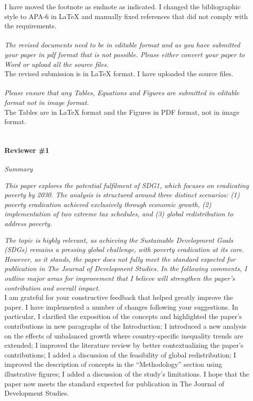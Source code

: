\documentclass[12pt,english]{article}
\begin{document}
I have moved the footnote as endnote as indicated. I changed the bibliographic style to APA-6 in LaTeX and manually fixed references that did not comply with the requirements. 
~\\ ~\\

\textit{The revised documents need to be in editable format and as you have submitted your paper in pdf format that is not possible. Please either convert your paper to Word or upload all the source files.}~\\

The revised submission is in LaTeX format. I have uploaded the source files.
~\\ ~\\

\textit{Please ensure that any Tables, Equations and Figures are submitted in editable format not in image format.}~\\

The Tables are in LaTeX format and the Figures in PDF format, not in image format.
~\\ ~\\


\paragraph*{Reviewer \#1}

\textit{Summary}

\textit{This paper explores the potential fulfilment of SDG1, which focuses on eradicating poverty by 2030. The analysis is structured around three distinct scenarios: (1) poverty eradication achieved exclusively through economic growth, (2) implementation of two extreme tax schedules, and (3) global redistribution to address poverty. }

\textit{The topic is highly relevant, as achieving the Sustainable Development Goals (SDGs) remains a pressing global challenge, with poverty eradication at its core. However, as it stands, the paper does not fully meet the standard expected for publication in The Journal of Development Studies. In the following comments, I outline major areas for improvement that I believe will strengthen the paper's contribution and overall impact.}~\\

I am grateful for your constructive feedback that helped greatly improve the paper. I have implemented a number of changes following your suggestions. In particular, I clarified the exposition of the concepts and highlighted the paper's contributions in new paragraphs of the Introduction; I introduced a new analysis on the effects of unbalanced growth where country-specific inequality trends are extended; I improved the literature review by better contextualizing the paper's contributions; I added a discussion of the feasibility of global redistribution; I improved the description of concepts in the ``Methodology'' section using illustrative figures; I added a discussion of the study's limitations. I hope that the paper now meets the standard expected for publication in The Journal of Development Studies. ~\\
~\\ 
\end{document}
